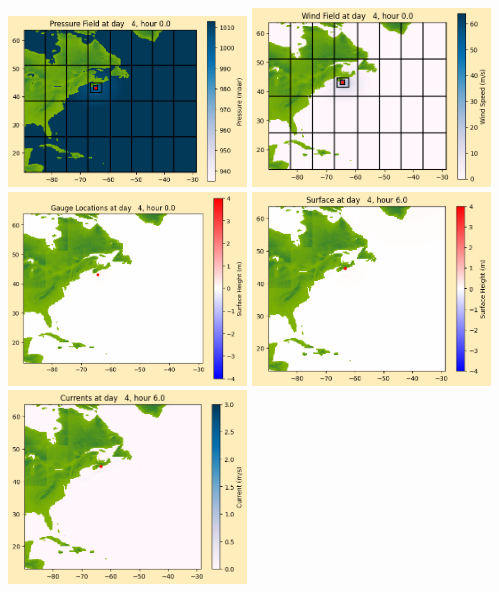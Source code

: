 \documentclass[11pt]{article}
\begin{document}
\includegraphics[width=0.475\textwidth]{frame0028fig1012.png}
\vskip 10pt 
\includegraphics[width=0.475\textwidth]{frame0028fig1013.png}
\includegraphics[width=0.475\textwidth]{frame0028fig1014.png}
\vskip 10pt 
\includegraphics[width=0.475\textwidth]{frame0029fig1001.png}
\includegraphics[width=0.475\textwidth]{frame0029fig1002.png}
\end{document}
